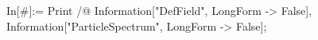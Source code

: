 In[#]:= Print /@ {Information["DefField", LongForm -> False], Information["ParticleSpectrum", LongForm -> False]}; 